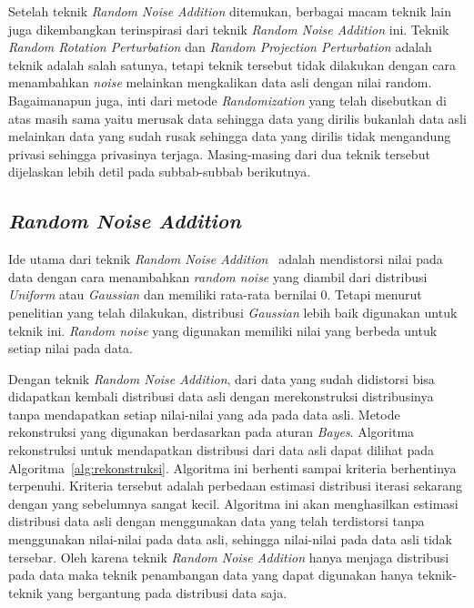 Setelah teknik \textit{Random Noise Addition} ditemukan, berbagai macam teknik lain juga dikembangkan terinspirasi dari teknik \textit{Random Noise Addition} ini. Teknik \textit{Random Rotation Perturbation} dan \textit{Random Projection Perturbation} adalah teknik adalah salah satunya, tetapi teknik tersebut tidak dilakukan dengan cara menambahkan \textit{noise} melainkan mengkalikan data asli dengan nilai random. Bagaimanapun juga, inti dari metode \textit{Randomization} yang telah disebutkan di atas masih sama yaitu merusak data sehingga data yang dirilis bukanlah data asli melainkan data yang sudah rusak sehingga data yang dirilis tidak mengandung privasi sehingga privasinya terjaga. Masing-masing dari dua teknik tersebut dijelaskan lebih detil pada subbab-subbab berikutnya.

\subsection{\textit{Random Noise Addition}}
\label{subsec:rna}

Ide utama dari teknik \textit{Random Noise Addition}~\cite{agrawalsrikant:00:randomnoise} adalah mendistorsi nilai pada data dengan cara menambahkan \textit{random noise} yang diambil dari distribusi \textit{Uniform} atau \textit{Gaussian} dan memiliki rata-rata bernilai 0. Tetapi menurut penelitian yang telah dilakukan, distribusi \textit{Gaussian} lebih baik digunakan untuk teknik ini. \textit{Random noise} yang digunakan memiliki nilai yang berbeda untuk setiap nilai pada data.

Dengan teknik \textit{Random Noise Addition}, dari data yang sudah didistorsi bisa didapatkan kembali distribusi data asli dengan merekonstruksi distribusinya tanpa mendapatkan setiap nilai-nilai yang ada pada data asli. Metode rekonstruksi yang digunakan berdasarkan pada aturan \textit{Bayes}. Algoritma rekonstruksi untuk mendapatkan distribusi dari data asli dapat dilihat pada Algoritma~\ref{alg:rekonstruksi}. Algoritma ini berhenti sampai kriteria berhentinya terpenuhi. Kriteria tersebut adalah perbedaan estimasi distribusi iterasi sekarang dengan yang sebelumnya sangat kecil. Algoritma ini akan menghasilkan estimasi distribusi data asli dengan menggunakan data yang telah terdistorsi tanpa menggunakan nilai-nilai pada data asli, sehingga nilai-nilai pada data asli tidak tersebar. Oleh karena teknik \textit{Random Noise Addition} hanya menjaga distribusi pada data maka teknik penambangan data yang dapat digunakan hanya teknik-teknik yang bergantung pada distribusi data saja.

